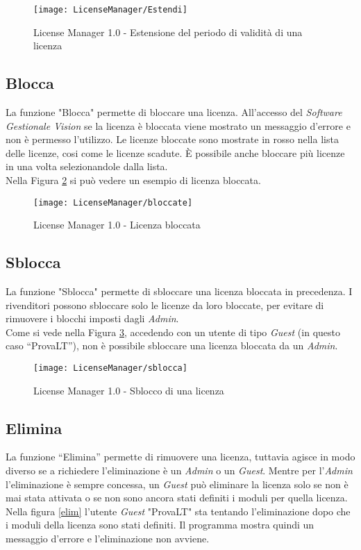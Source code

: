 \begin{figure}[!h] 
    \centering 
    \texttt{[image: LicenseManager/Estendi]} 
    \caption{License Manager 1.0 - Estensione del periodo di validità di una licenza}
\label{estendi}
\end{figure}


\subsection{Blocca}

La funzione "Blocca" permette di bloccare una licenza. All’accesso del \textit{Software Gestionale Vision} se la licenza è bloccata viene mostrato un messaggio d’errore e non è permesso l’utilizzo.
Le licenze bloccate sono mostrate in rosso nella lista delle licenze, cosi come le licenze scadute.
È possibile anche bloccare più licenze in una volta selezionandole dalla lista.
\\
Nella Figura \ref{block} si può vedere un esempio di licenza bloccata.
\begin{figure}[!h] 
    \centering 
    \texttt{[image: LicenseManager/bloccate]} 
    \caption{License Manager 1.0 - Licenza bloccata}
\label{block}
\end{figure}

\subsection{Sblocca}
La funzione "Sblocca" permette di sbloccare una licenza bloccata in precedenza.
I rivenditori possono sbloccare solo le licenze da loro bloccate, per evitare di rimuovere i blocchi imposti dagli \textit{Admin}.\\
Come si vede nella Figura \ref{sblocca}, accedendo con un utente di tipo \textit{Guest} (in questo caso “ProvaLT”), non è possibile sbloccare una licenza bloccata da un \textit{Admin}.

\begin{figure}[!h] 
    \centering 
    \texttt{[image: LicenseManager/sblocca]} 
    \caption{License Manager 1.0 - Sblocco di una licenza}
\label{sblocca}
\end{figure}

\subsection{Elimina}
La funzione “Elimina” permette di rimuovere una licenza, tuttavia agisce in modo diverso se a richiedere l'eliminazione è un \textit{Admin} o un \textit{Guest}. Mentre per l’\textit{Admin} l’eliminazione è sempre concessa, un \textit{Guest} può eliminare la licenza solo se non è mai stata attivata o se non sono ancora stati definiti i moduli per quella licenza.\\
Nella figura \ref{elim} l’utente \textit{Guest} "ProvaLT" sta tentando l’eliminazione dopo che i moduli della licenza sono stati definiti. Il programma mostra quindi un messaggio d’errore e l’eliminazione non avviene.

